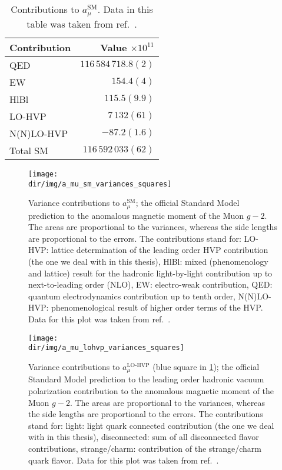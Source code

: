 \begin{table}
\begin{tabular}{lr}
\toprule
Contribution & Value $\times 10^{11}$  \\
\midrule
QED         & $116\, 584\, 718.8(2)$   \\
EW          & $154.4(4)$               \\
HlBl        & $115.5(9.9)$             \\
LO-HVP      & $7\, 132(61)$            \\
N(N)LO-HVP  & $-87.2(1.6)$             \\
\midrule
Total SM    & $116\, 592\, 033(62)$    \\
\bottomrule
\end{tabular}
\caption{
\label{tab:a:mu:contributions}
Contributions to $a_{\mu}^{\text{SM}}$.
Data in this table was taken from ref.~\cite{snowmass:2025}.
}
\end{table}

\begin{figure}
\centering
\texttt{[image: \\dir/img/a\_mu\_sm\_variances\_squares]} %
\caption{
Variance contributions to $a_{\mu}^{\text{SM}}$; the official Standard Model prediction to the anomalous magnetic moment of the Muon $g-2$.
The areas are proportional to the variances, whereas the side lengths are proportional to the errors.
The contributions stand for: LO-HVP: lattice determination of the leading order HVP contribution (the one we deal with in this thesis), HlBl: mixed (phenomenology and lattice) result for the hadronic light-by-light contribution up to next-to-leading order (NLO), EW: electro-weak contribution, QED: quantum electrodynamics contribution up to tenth order, N(N)LO-HVP: phenomenological result of higher order terms of the HVP.
Data for this plot was taken from ref.~\cite{snowmass:2025}.
}
\label{fig:a_mu:sm:variances}
\end{figure}

\begin{figure}
\centering
\texttt{[image: \\dir/img/a\_mu\_lohvp\_variances\_squares]}
\caption{
Variance contributions to $a_{\mu}^{\text{LO-HVP}}$ (blue square in \cref{fig:a_mu:sm:variances}); the official Standard Model prediction to the leading order hadronic vacuum polarization contribution to the anomalous magnetic moment of the Muon $g-2$.
The areas are proportional to the variances, whereas the side lengths are proportional to the errors.
The contributions stand for: light: light quark connected contribution (the one we deal with in this thesis), disconnected: sum of all disconnected flavor contributions, strange/charm: contribution of the strange/charm quark flavor.
Data for this plot was taken from ref.~\cite{snowmass:2025}.
}
\label{fig:a_mu:lohvp:variances}
\end{figure}

